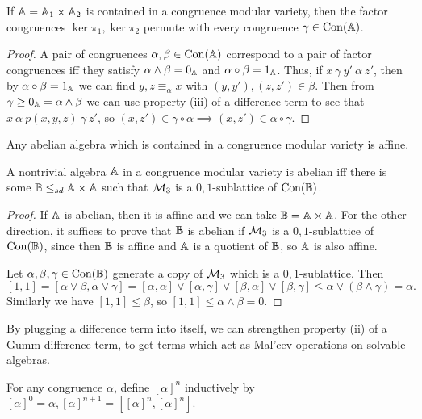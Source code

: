 \begin{appendices}
\begin{cor} If $\mathbb{A} = \mathbb{A}_1\times \mathbb{A}_2$ is contained in a congruence modular variety, then the factor congruences $\ker \pi_1,\ker \pi_2$ permute with every congruence $\gamma \in \operatorname{Con}(\mathbb{A})$.
\end{cor}
\begin{proof} A pair of congruences $\alpha,\beta \in \operatorname{Con}(\mathbb{A})$ correspond to a pair of factor congruences iff they satisfy $\alpha \wedge \beta = 0_{\mathbb{A}}$ and $\alpha \circ \beta = 1_{\mathbb{A}}$. Thus, if $x\ \gamma\ y'\ \alpha\ z'$, then by $\alpha \circ \beta = 1_{\mathbb{A}}$ we can find $y, z \equiv_\alpha x$ with $(y,y'), (z,z') \in \beta$. Then from $\gamma \ge 0_{\mathbb{A}} = \alpha \wedge \beta$ we can use property (iii) of a difference term to see that $x\ \alpha\ p(x,y,z)\ \gamma\ z'$, so $(x,z') \in \gamma \circ \alpha \implies (x,z') \in \alpha \circ \gamma$.
\end{proof}

\begin{cor} Any abelian algebra which is contained in a congruence modular variety is affine.
\end{cor}

\begin{cor} A nontrivial algebra $\mathbb{A}$ in a congruence modular variety is abelian iff there is some $\mathbb{B} \le_{sd} \mathbb{A}\times \mathbb{A}$ such that $\mathcal{M}_3$ is a $0,1$-sublattice of $\operatorname{Con}(\mathbb{B})$.
\end{cor}
\begin{proof} If $\mathbb{A}$ is abelian, then it is affine and we can take $\mathbb{B} = \mathbb{A}\times \mathbb{A}$. For the other direction, it suffices to prove that $\mathbb{B}$ is abelian if $\mathcal{M}_3$ is a $0,1$-sublattice of $\operatorname{Con}(\mathbb{B})$, since then $\mathbb{B}$ is affine and $\mathbb{A}$ is a quotient of $\mathbb{B}$, so $\mathbb{A}$ is also affine.

Let $\alpha, \beta, \gamma \in \operatorname{Con}(\mathbb{B})$ generate a copy of $\mathcal{M}_3$ which is a $0,1$-sublattice. Then
\[
[1,1] = [\alpha \vee \beta, \alpha \vee \gamma] = [\alpha,\alpha]\vee [\alpha,\gamma]\vee [\beta,\alpha]\vee [\beta,\gamma] \le \alpha \vee (\beta \wedge \gamma) = \alpha.
\]
Similarly we have $[1,1] \le \beta$, so $[1,1] \le \alpha \wedge \beta = 0$.
\end{proof}

By plugging a difference term into itself, we can strengthen property (ii) of a Gumm difference term, to get terms which act as Mal'cev operations on solvable algebras.

\begin{defn} For any congruence $\alpha$, define $[\alpha]^n$ inductively by $[\alpha]^0 = \alpha, [\alpha]^{n+1} = [[\alpha]^n,[\alpha]^n]$.
\end{defn}


\end{appendices}
